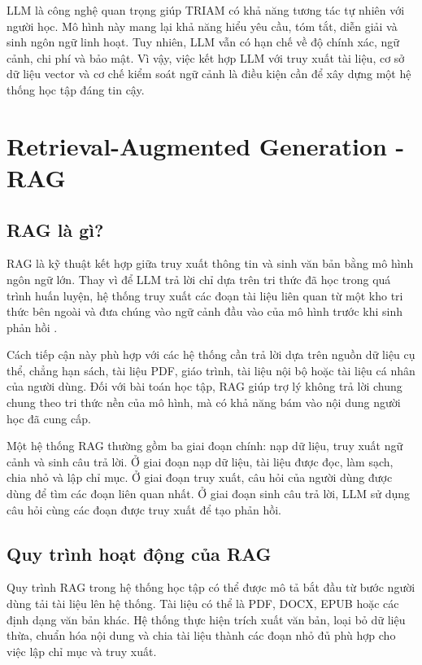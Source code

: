 \documentclass[12pt,a4paper]{report}
\begin{document}
LLM là công nghệ quan trọng giúp TRIAM có khả năng tương tác tự nhiên với người học. Mô hình này mang lại khả năng hiểu yêu cầu, tóm tắt, diễn giải và sinh ngôn ngữ linh hoạt. Tuy nhiên, LLM vẫn có hạn chế về độ chính xác, ngữ cảnh, chi phí và bảo mật. Vì vậy, việc kết hợp LLM với truy xuất tài liệu, cơ sở dữ liệu vector và cơ chế kiểm soát ngữ cảnh là điều kiện cần để xây dựng một hệ thống học tập đáng tin cậy.

\section{Retrieval-Augmented Generation - RAG}

\subsection{RAG là gì?}

RAG là kỹ thuật kết hợp giữa truy xuất thông tin và sinh văn bản bằng mô hình ngôn ngữ lớn. Thay vì để LLM trả lời chỉ dựa trên tri thức đã học trong quá trình huấn luyện, hệ thống truy xuất các đoạn tài liệu liên quan từ một kho tri thức bên ngoài và đưa chúng vào ngữ cảnh đầu vào của mô hình trước khi sinh phản hồi \cite{lewis2020rag}.

Cách tiếp cận này phù hợp với các hệ thống cần trả lời dựa trên nguồn dữ liệu cụ thể, chẳng hạn sách, tài liệu PDF, giáo trình, tài liệu nội bộ hoặc tài liệu cá nhân của người dùng. Đối với bài toán học tập, RAG giúp trợ lý không trả lời chung chung theo tri thức nền của mô hình, mà có khả năng bám vào nội dung người học đã cung cấp.

Một hệ thống RAG thường gồm ba giai đoạn chính: nạp dữ liệu, truy xuất ngữ cảnh và sinh câu trả lời. Ở giai đoạn nạp dữ liệu, tài liệu được đọc, làm sạch, chia nhỏ và lập chỉ mục. Ở giai đoạn truy xuất, câu hỏi của người dùng được dùng để tìm các đoạn liên quan nhất. Ở giai đoạn sinh câu trả lời, LLM sử dụng câu hỏi cùng các đoạn được truy xuất để tạo phản hồi.

\subsection{Quy trình hoạt động của RAG}

Quy trình RAG trong hệ thống học tập có thể được mô tả bắt đầu từ bước người dùng tải tài liệu lên hệ thống. Tài liệu có thể là PDF, DOCX, EPUB hoặc các định dạng văn bản khác. Hệ thống thực hiện trích xuất văn bản, loại bỏ dữ liệu thừa, chuẩn hóa nội dung và chia tài liệu thành các đoạn nhỏ đủ phù hợp cho việc lập chỉ mục và truy xuất.
\end{document}
